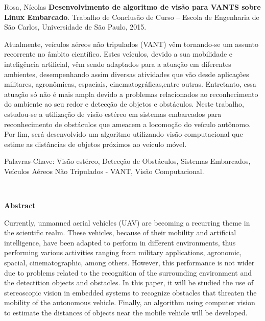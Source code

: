 \vspace{0.05\textheight}
Rosa, Nícolas \textbf{Desenvolvimento de algoritmo de visão para VANTS sobre Linux Embarcado}. Trabalho de Conclusão de Curso -- Escola de Engenharia de São Carlos, Universidade de São Paulo, 2015.

Atualmente, veículos aéreos não tripulados (VANT) vêm tornando-se um assunto recorrente no âmbito científico. Estes veículos, devido a sua mobilidade e inteligência artificial, vêm sendo adaptados para a atuação em diferentes ambientes, desempenhando assim diversas atividades que vão desde
aplicações militares, agronômicas, espaciais, cinematográficas,entre outras.    
Entretanto, essa atuação só não é mais ampla devido a problemas relacionados ao reconhecimento do ambiente ao seu redor e detecção de objetos e obstáculos. Neste trabalho, estudou-se a utilização de visão estéreo em sistemas embarcados para reconhecimento de obstáculos que ameacem a locomoção do veículo autônomo. Por fim, será desenvolvido um algoritmo utilizando visão computacional que estime as distâncias de objetos próximos ao veículo móvel.

\vspace{0.05\textheight}
	
Palavras-Chave: Visão estéreo, Detecção de Obstáculos, Sistemas Embarcados, Veículos Aéreos Não Tripulados - VANT, Visão Computacional.

\cleardoublepage

\
\vspace{0.11\textheight} 

\begin{center}
\textbf{\Huge{Abstract}}
\end{center}

\vspace{0.05\textheight}	
		
Currently, unmanned aerial vehicles (UAV) are becoming a recurring theme in the scientific realm. These vehicles, because of their mobility and artificial intelligence, have been adapted to perform in different environments, thus performing various activities ranging from
military applications, agronomic, spacial, cinematographic, among others.
However, this performance is not wider due to  problems related to the recognition of the surrounding environment and the detectition objects and obstacles. In this paper, it will be studied the use of stereoscopic vision in embedded systems to recognize obstacles that threaten the mobility of the autonomous vehicle. Finally, an algorithm using computer vision to estimate the distances of objects near the mobile vehicle will be developed.

